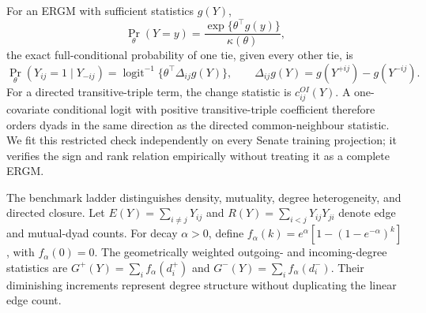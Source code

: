 \documentclass{nws}
\begin{document}
For an ERGM with sufficient statistics $g(Y)$,
\begin{equation}
 \Pr_{\theta}(Y=y)=\frac{\exp\{\theta^{\top}g(y)\}}{\kappa(\theta)},
 \label{eq:ergm}
\end{equation}
the exact full-conditional probability of one tie, given every other tie, is
\begin{equation}
 \Pr_{\theta}(Y_{ij}=1\mid Y_{-ij})=
 \operatorname{logit}^{-1}\{\theta^{\top}\Delta_{ij}g(Y)\},
 \qquad
 \Delta_{ij}g(Y)=g(Y^{+ij})-g(Y^{-ij}).
 \label{eq:ergm-conditional}
\end{equation}
For a directed transitive-triple term, the change statistic is $c_{ij}^{OI}(Y)$. A one-covariate conditional logit with positive transitive-triple coefficient therefore orders dyads in the same direction as the directed common-neighbour statistic. We fit this restricted check independently on every Senate training projection; it verifies the sign and rank relation empirically without treating it as a complete ERGM.

The benchmark ladder distinguishes density, mutuality, degree heterogeneity, and directed closure. Let $E(Y)=\sum_{i\ne j}Y_{ij}$ and $R(Y)=\sum_{i<j}Y_{ij}Y_{ji}$ denote edge and mutual-dyad counts. For decay $\alpha>0$, define $f_\alpha(k)=e^\alpha[1-(1-e^{-\alpha})^k]$, with $f_\alpha(0)=0$. The geometrically weighted outgoing- and incoming-degree statistics are $G^+(Y)=\sum_i f_\alpha(d_i^+)$ and $G^-(Y)=\sum_i f_\alpha(d_i^-)$. Their diminishing increments represent degree structure without duplicating the linear edge count.
\end{document}

